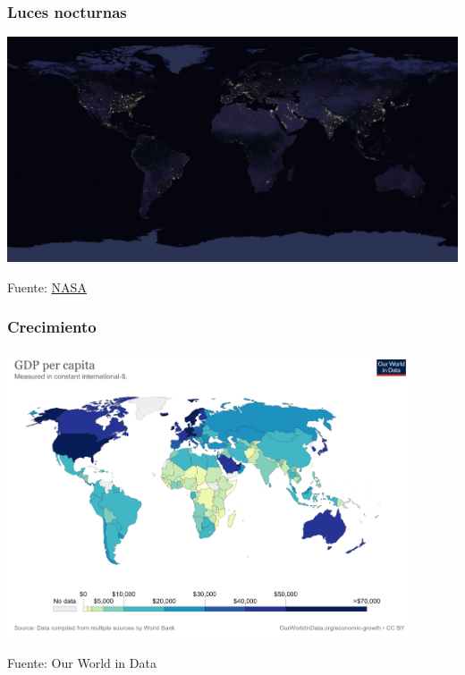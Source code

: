 \documentclass{beamer}
\begin{document}
\begin{frame}
\frametitle{Luces nocturnas}
\begin{center}
    \includegraphics[scale=0.06]{Slides Principios de Economia/Tema_11.11_crecimiento2.jpg}
\end{center}
Fuente: \href{https://www.nasa.gov/feature/goddard/2017/new-night-lights-maps-open-up-possible-real-time-applications}{NASA}
\end{frame}

\begin{frame}
\frametitle{Crecimiento}
\begin{center}
    \href{https://ourworldindata.org/grapher/gdp-per-capita-worldbank} {\includegraphics[width=0.9\textwidth]{Slides Principios de Economia/Figures/gdppc2020.png}}
\end{center}
Fuente: Our World in Data
\end{frame}
\end{document}
